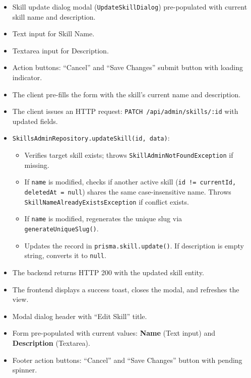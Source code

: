 \begin{itemize}[leftmargin=1.6em,topsep=3pt,itemsep=2pt,parsep=0pt,label=$\bullet$]
    \item Skill update dialog modal (\texttt{UpdateSkillDialog}) pre-populated with current skill name and description.
    \item Text input for Skill Name.
    \item Textarea input for Description.
    \item Action buttons: ``Cancel'' and ``Save Changes'' submit button with loading indicator.
\end{itemize}

\begin{itemize}[leftmargin=1.6em,topsep=3pt,itemsep=2pt,parsep=0pt,label=$\bullet$]
    \item The client pre-fills the form with the skill's current name and description.
    \item The client issues an HTTP request: \texttt{PATCH /api/admin/skills/:id} with updated fields.
    \item \texttt{SkillsAdminRepository.updateSkill(id, data)}:
        \begin{itemize}[leftmargin=1.6em,topsep=2pt,itemsep=2pt,parsep=0pt]
            \item Verifies target skill exists; throws \texttt{SkillAdmin\-Not\-Found\-Exception} if missing.
            \item If \texttt{name} is modified, checks if another active skill (\texttt{id != currentId, deletedAt = null}) shares the same case-insensitive name. Throws \texttt{SkillName\-Already\-Exists\-Exception} if conflict exists.
            \item If \texttt{name} is modified, regenerates the unique slug via \texttt{generateUniqueSlug()}.
            \item Updates the record in \texttt{prisma.skill.update()}. If description is empty string, converts it to \texttt{null}.
        \end{itemize}
    \item The backend returns HTTP 200 with the updated skill entity.
    \item The frontend displays a success toast, closes the modal, and refreshes the view.
\end{itemize}

\begin{itemize}[leftmargin=1.6em,topsep=3pt,itemsep=2pt,parsep=0pt,label=$\bullet$]
    \item Modal dialog header with ``Edit Skill'' title.
    \item Form pre-populated with current values: \textbf{Name} (Text input) and \textbf{Description} (Textarea).
    \item Footer action buttons: ``Cancel'' and ``Save Changes'' button with pending spinner.
\end{itemize}

